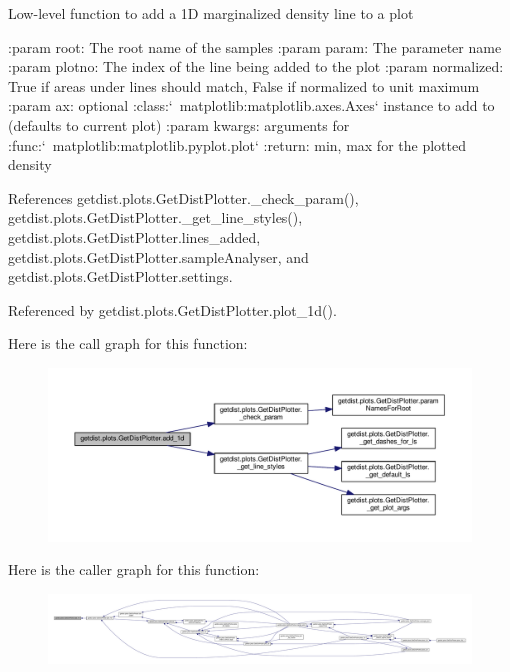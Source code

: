 \begin{DoxyVerb}Low-level function to add a 1D marginalized density line to a plot

:param root: The root name of the samples
:param param: The parameter name
:param plotno: The index of the line being added to the plot
:param normalized: True if areas under lines should match, False if normalized to unit maximum
:param ax: optional :class:`~matplotlib:matplotlib.axes.Axes` instance to add to (defaults to current plot)
:param kwargs: arguments for :func:`~matplotlib:matplotlib.pyplot.plot`
:return: min, max for the plotted density
\end{DoxyVerb}
 

References getdist.\+plots.\+Get\+Dist\+Plotter.\+\_\+check\+\_\+param(), getdist.\+plots.\+Get\+Dist\+Plotter.\+\_\+get\+\_\+line\+\_\+styles(), getdist.\+plots.\+Get\+Dist\+Plotter.\+lines\+\_\+added, getdist.\+plots.\+Get\+Dist\+Plotter.\+sample\+Analyser, and getdist.\+plots.\+Get\+Dist\+Plotter.\+settings.



Referenced by getdist.\+plots.\+Get\+Dist\+Plotter.\+plot\+\_\+1d().

Here is the call graph for this function\+:
\nopagebreak
\begin{figure}[H]
\begin{center}
\leavevmode
\includegraphics[width=350pt]{classgetdist_1_1plots_1_1GetDistPlotter_a2c75c431ff53d33697077671d1da1396_cgraph}
\end{center}
\end{figure}
Here is the caller graph for this function\+:
\nopagebreak
\begin{figure}[H]
\begin{center}
\leavevmode
\includegraphics[width=350pt]{classgetdist_1_1plots_1_1GetDistPlotter_a2c75c431ff53d33697077671d1da1396_icgraph}
\end{center}
\end{figure}
\mbox{\label{classgetdist_1_1plots_1_1GetDistPlotter_a0a51d5af908d2dc06b0e26d5bad61e89}} 
